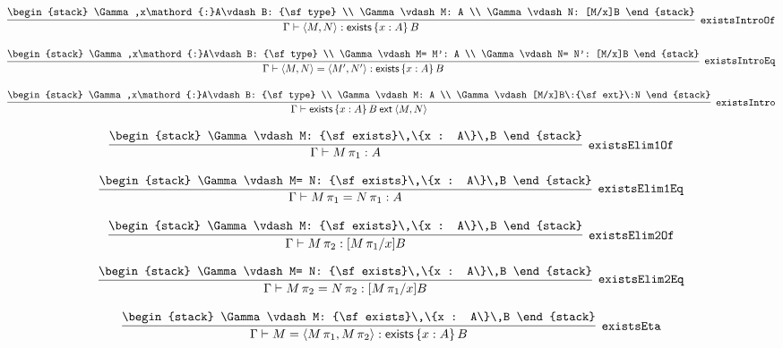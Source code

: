 \[
\infer[{\tt existsIntroOf}]{\Gamma \vdash \langle M,N\rangle : {\sf exists}\,\{x : A\}\,B}{
\begin{stack}
\Gamma ,x\mathord{:}A\vdash B: {\sf type}
\\
\Gamma \vdash M: A
\\
\Gamma \vdash N: [M/x]B
\end{stack}}
\]

\[
\infer[{\tt existsIntroEq}]{\Gamma \vdash \langle M,N\rangle = \langle M',N'\rangle : {\sf exists}\,\{x : A\}\,B}{
\begin{stack}
\Gamma ,x\mathord{:}A\vdash B: {\sf type}
\\
\Gamma \vdash M= M': A
\\
\Gamma \vdash N= N': [M/x]B
\end{stack}}
\]

\[
\infer[{\tt existsIntro}]{\Gamma \vdash {\sf exists}\,\{x : A\}\,B\:{\sf ext}\:\langle M,N\rangle }{
\begin{stack}
\Gamma ,x\mathord{:}A\vdash B: {\sf type}
\\
\Gamma \vdash M: A
\\
\Gamma \vdash [M/x]B\:{\sf ext}\:N
\end{stack}}
\]

\[
\infer[{\tt existsElim1Of}]{\Gamma \vdash M\, \pi_1: A}{
\begin{stack}
\Gamma \vdash M: {\sf exists}\,\{x : A\}\,B
\end{stack}}
\]

\[
\infer[{\tt existsElim1Eq}]{\Gamma \vdash M\, \pi_1= N\, \pi_1: A}{
\begin{stack}
\Gamma \vdash M= N: {\sf exists}\,\{x : A\}\,B
\end{stack}}
\]

\[
\infer[{\tt existsElim2Of}]{\Gamma \vdash M\, \pi_2: [M\, \pi_1/x]B}{
\begin{stack}
\Gamma \vdash M: {\sf exists}\,\{x : A\}\,B
\end{stack}}
\]

\[
\infer[{\tt existsElim2Eq}]{\Gamma \vdash M\, \pi_2= N\, \pi_2: [M\, \pi_1/x]B}{
\begin{stack}
\Gamma \vdash M= N: {\sf exists}\,\{x : A\}\,B
\end{stack}}
\]

\[
\infer[{\tt existsEta}]{\Gamma \vdash M= \langle M\, \pi_1,M\, \pi_2\rangle : {\sf exists}\,\{x : A\}\,B}{
\begin{stack}
\Gamma \vdash M: {\sf exists}\,\{x : A\}\,B
\end{stack}}
\]

